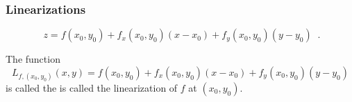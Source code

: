 \begin{frame}
  \frametitle{Linearizations}
$$\boxed{ \; z= f(x_0,y_0) + f_x(x_0,y_0) (x-x_0) + f_y(x_0,y_0)(y-y_0) \; }\; .$$

\begin{definition}
The function
$$L_{f,(x_0,y_0)} (x,y) = f(x_0,y_0) + f_x(x_0,y_0) (x-x_0) + f_y(x_0,y_0)(y-y_0)$$ is called the is called the \alert<1->{linearization} of $f$ at $(x_0,y_0)$.
\end{definition}
\end{frame}
